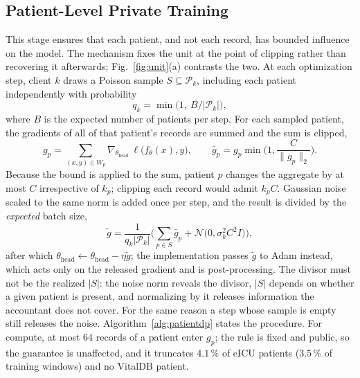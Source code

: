 \subsection{Patient-Level Private Training}
\label{sec:method:privacy}
This stage ensures that each patient, and not each record, has bounded
influence on the model. The mechanism fixes the unit at the point of clipping
rather than recovering it afterwards; Fig.~\ref{fig:unit}(a) contrasts the
two. At each optimization step, client $k$
draws a Poisson sample $S \subseteq \mathcal{P}_k$, including each patient
independently with probability
\begin{equation}
q_k = \min\big(1,\ B/|\mathcal{P}_k|\big),
\label{eq:q}
\end{equation}
where $B$ is the expected number of patients per step. For each sampled
patient, the gradients of all of that patient's records are summed and the sum
is clipped,
\begin{equation}
g_p = \!\!\sum_{(x,y)\in W_p}\!\! \nabla_{\theta_{\mathrm{head}}}\,
       \ell\big(f_\theta(x), y\big), \qquad
\bar{g}_p = g_p \min\!\Big(1, \frac{C}{\lVert g_p \rVert_2}\Big).
\label{eq:clip}
\end{equation}
Because the bound is applied to the sum, patient $p$ changes the aggregate by
at most $C$ irrespective of $k_p$; clipping each record would admit $k_p C$.
Gaussian noise scaled to the same norm is added once per step, and the result
is divided by the \emph{expected} batch size,
\begin{equation}
\tilde{g} = \frac{1}{q_k |\mathcal{P}_k|}\Big( \sum_{p \in S} \bar{g}_p
+ \mathcal{N}\big(0, \sigma_k^2 C^2 I\big) \Big),
\label{eq:noise}
\end{equation}
after which $\theta_{\mathrm{head}} \leftarrow \theta_{\mathrm{head}} - \eta
\tilde{g}$; the implementation passes $\tilde{g}$ to Adam instead, which acts
only on the released gradient and is post-processing. The divisor must not be the realized $|S|$: the noise norm reveals
the divisor, $|S|$ depends on whether a given patient is present, and
normalizing by it releases information the accountant does not cover. For the
same reason a step whose sample is empty still releases the noise.
Algorithm~\ref{alg:patientdp} states the procedure. For compute, at most
$64$ records of a patient enter $g_p$; the rule is fixed and public, so the
guarantee is unaffected, and it truncates $4.1\,\%$ of eICU patients
($3.5\,\%$ of training windows) and no VitalDB patient.

